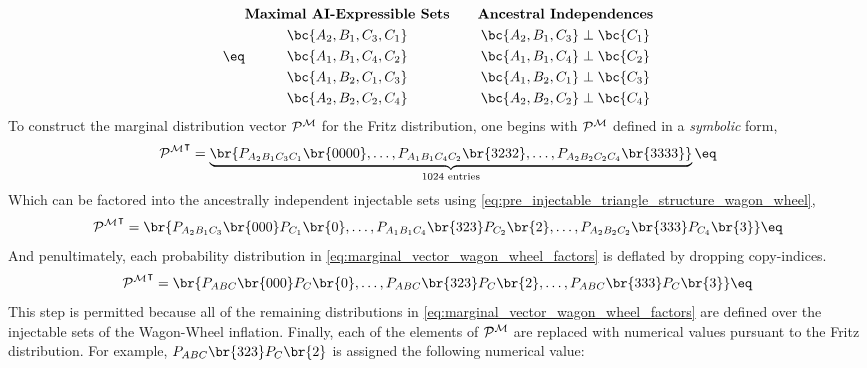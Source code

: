 \documentclass[aps, 10pt, english, twoside, pra, nofootinbib, tightenlines, longbibliography, superscriptaddress]{revtex4-1}
\begin{document}
    \begin{equation*}
        \eq \label{eq:pre_injectable_triangle_structure_wagon_wheel}
        \begin{gathered}
            \textbf{Maximal AI-Expressible Sets} \\
            \bc{A_2, B_1, C_3, C_1} \\
            \bc{A_1, B_1, C_4, C_2} \\
            \bc{A_1, B_2, C_1, C_3} \\
            \bc{A_2, B_2, C_2, C_4} \\
        \end{gathered}
        \qquad
        \begin{gathered}
            \textbf{Ancestral Independences} \\
            \bc{A_2, B_1, C_3} \ancestralindep \bc{C_1} \\
            \bc{A_1, B_1, C_4} \ancestralindep \bc{C_2} \\
            \bc{A_1, B_2, C_1} \ancestralindep \bc{C_3} \\
            \bc{A_2, B_2, C_2} \ancestralindep \bc{C_4} \\
        \end{gathered}
    \end{equation*}
    To construct the marginal distribution vector $\probvec^{\mscenario}$ for the Fritz distribution, one begins with $\probvec^{\mscenario}$ defined in a \textit{symbolic} form,
    \[ {\probvec^{\mscenario}}^{\intercal} = \underbrace{\br{\prob[A_2B_1C_3C_1]\br{0000}, \ldots, \prob[A_1B_1C_4C_2]\br{3232}, \ldots, \prob[A_2B_2C_2C_4]\br{3333}}}_{1024 \text{ entries}} \eq \label{eq:marginal_vector_wagon_wheel} \]
    Which can be factored into the ancestrally independent injectable sets using \cref{eq:pre_injectable_triangle_structure_wagon_wheel},
    \[ {\probvec^{\mscenario}}^{\intercal} = \br{\prob[A_2B_1C_3]\br{000}\prob[C_1]\br{0}, \ldots, \prob[A_1B_1C_4]\br{323}\prob[C_2]\br{2}, \ldots, \prob[A_2B_2C_2]\br{333}\prob[C_4]\br{3}} \eq \label{eq:marginal_vector_wagon_wheel_factors}\]
    And penultimately, each probability distribution in \cref{eq:marginal_vector_wagon_wheel_factors} is deflated by dropping copy-indices.
    \[ {\probvec^{\mscenario}}^{\intercal} = \br{\prob[ABC]\br{000}\prob[C]\br{0}, \ldots, \prob[ABC]\br{323}\prob[C]\br{2}, \ldots, \prob[ABC]\br{333}\prob[C]\br{3}} \eq \label{eq:marginal_vector_wagon_wheel_factors_dropped}\]
    This step is permitted because all of the remaining distributions in \cref{eq:marginal_vector_wagon_wheel_factors} are defined over the injectable sets of the Wagon-Wheel inflation. Finally, each of the elements of $\probvec^{\mscenario}$ are replaced with numerical values pursuant to the Fritz distribution. For example, $\prob[ABC]\br{323}\prob[C]\br{2}$ is assigned the following numerical value:
\end{document}
